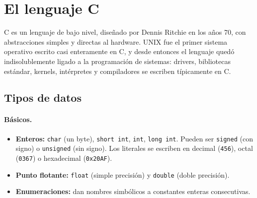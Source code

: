 \documentclass[11pt,a4paper]{article}
\begin{document}
\section{El lenguaje C}

C es un lenguaje de bajo nivel, diseñado por Dennis Ritchie en los
años 70, con abstracciones simples y directas al hardware. UNIX fue el
primer sistema operativo escrito casi enteramente en C, y desde
entonces el lenguaje quedó indisolublemente ligado a la programación
de sistemas: drivers, bibliotecas estándar, kernels, intérpretes y
compiladores se escriben típicamente en C.

\subsection{Tipos de datos}

\paragraph{Básicos.}
\begin{itemize}[leftmargin=*]
    \item \textbf{Enteros:} \texttt{char} (un byte), \texttt{short
        int}, \texttt{int}, \texttt{long int}. Pueden ser
        \texttt{signed} (con signo) o \texttt{unsigned} (sin signo).
        Los literales se escriben en decimal (\texttt{456}), octal
        (\texttt{0367}) o hexadecimal (\texttt{0x20AF}).
    \item \textbf{Punto flotante:} \texttt{float} (simple precisión)
        y \texttt{double} (doble precisión).
    \item \textbf{Enumeraciones:} dan nombres simbólicos a constantes
        enteras consecutivas.
\end{itemize}
\end{document}
